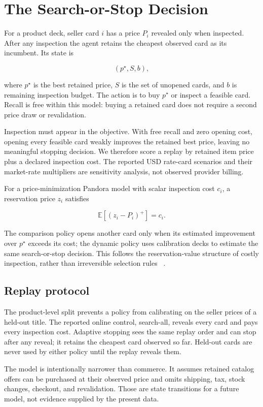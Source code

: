 \section{The Search-or-Stop Decision}
\label{sec:model}

For a product deck, seller card $i$ has a price $P_i$ revealed only when inspected.
After any inspection the agent retains the cheapest observed card as its incumbent.
Its state is

\begin{equation}
  (p^\star, S, b),
\end{equation}

where $p^\star$ is the best retained price, $S$ is the set of unopened cards, and
$b$ is remaining inspection budget. The action is to buy $p^\star$ or inspect a
feasible card. Recall is free within this model: buying a retained card does not
require a second price draw or revalidation.

Inspection must appear in the objective. With free recall and zero opening cost,
opening every feasible card weakly improves the retained best price, leaving no
meaningful stopping decision. We therefore score a replay by retained item price
plus a declared inspection cost. The reported USD rate-card scenarios and their
market-rate multipliers are sensitivity analysis, not observed provider billing.

For a price-minimization Pandora model with scalar inspection cost $c_i$, a
reservation price $z_i$ satisfies

\begin{equation}
  \mathbb{E}[(z_i-P_i)^+] = c_i.
  \label{eq:pandora-reservation}
\end{equation}

The comparison policy opens another card only when its estimated improvement over
$p^\star$ exceeds its cost; the dynamic policy uses calibration decks to estimate
the same search-or-stop decision. This follows the reservation-value structure of
costly inspection, rather than irreversible selection rules
~\citep{weitzman1979optimal,boodaghians2020pandora}.

\subsection{Replay protocol}

The product-level split prevents a policy from calibrating on the seller prices of a
held-out title. The reported online control, search-all, reveals every card and pays
every inspection cost. Adaptive stopping sees the same replay order and can stop after
any reveal; it retains the cheapest card observed so far. Held-out cards are never
used by either policy until the replay reveals them.

The model is intentionally narrower than commerce. It assumes retained catalog
offers can be purchased at their observed price and omits shipping, tax, stock
changes, checkout, and revalidation. Those are state transitions for a future model,
not evidence supplied by the present data.